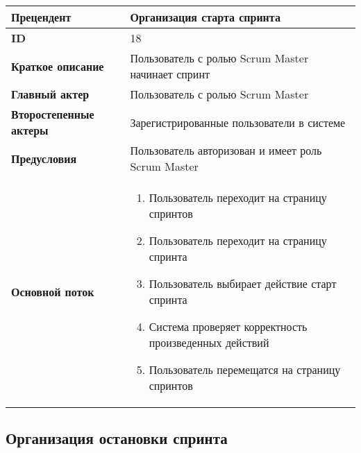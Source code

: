 \documentclass[14pt,a4paper]{extarticle}
\begin{document}
\begin{tabular}{|l|p{9cm}|}
	\hline
	\textbf{Прецендент}            & Организация старта спринта                                              \\
	\hline
	\textbf{ID}                    & 18                                                                      \\
	\hline
	\textbf{Краткое описание}      & Пользователь с ролью Scrum Master начинает спринт               	 \\
	\hline
	\textbf{Главный актер}         & Пользователь с ролью Scrum Master                                       \\
	\hline
	\textbf{Второстепенные актеры} & Зарегистрированные пользователи в системе                               \\
	\hline
	\textbf{Предусловия}           & Пользователь авторизован и имеет роль Scrum Master                      \\
	\hline
	\textbf{Основной поток}        & \begin{enumerate}
		                                 \item Пользователь переходит на страницу спринтов
		                                 \item Пользователь переходит на страницу спринта
						 \item Пользователь выбирает действие старт спринта
		                                 \item Система проверяет корректность произведенных действий
						 \item Пользователь перемещатся на страницу спринтов
	                                 \end{enumerate} \\
	\hline
\end{tabular}

\subsection{Организация остановки спринта}
\end{document}
